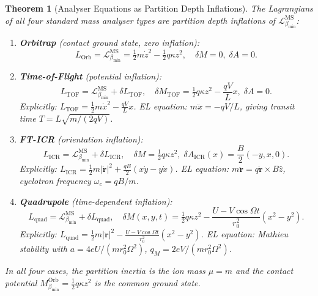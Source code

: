 \documentclass[12pt, a4paper]{article}
\theoremstyle{plain}
\newtheorem{theorem}{Theorem}[section]
\theoremstyle{definition}
\theoremstyle{remark}
\newcommand{\bmin}{\beta_{\min}}
\newcommand{\Lmin}{\mathcal{L}_{\bmin}}
\newcommand{\half}{\tfrac{1}{2}}
\begin{document}
\begin{theorem}[Analyser Equations as Partition Depth Inflations]
\label{thm:inflations}
The Lagrangians of all four standard mass analyser types are partition depth
inflations of $\Lmin^{\mathrm{MS}}$:

\begin{enumerate}[label=(\roman*)]
\item \textbf{Orbitrap} (contact ground state, zero inflation):
\[
  L_{\mathrm{Orb}} = \Lmin^{\mathrm{MS}} = \half m\dot{z}^2 - \half q\kappa z^2,
  \quad \delta M = 0,\;\delta A = 0.
\]

\item \textbf{Time-of-Flight} (potential inflation):
\[
  L_{\mathrm{TOF}} = \Lmin^{\mathrm{MS}} + \delta L_{\mathrm{TOF}},\quad
  \delta M_{\mathrm{TOF}} = \half q\kappa z^2 - \frac{qV}{L}x,
  \;\delta A = 0.
\]
Explicitly: $L_{\mathrm{TOF}} = \half m\dot{x}^2 - \frac{qV}{L}x$.
EL equation: $m\ddot{x} = -qV/L$, giving transit time $T = L\sqrt{m/(2qV)}$.

\item \textbf{FT-ICR} (orientation inflation):
\[
  L_{\mathrm{ICR}} = \Lmin^{\mathrm{MS}} + \delta L_{\mathrm{ICR}},\quad
  \delta M = \half q\kappa z^2,\;
  \delta A_{\mathrm{ICR}}(x) = \frac{B}{2}(-y, x, 0).
\]
Explicitly: $L_{\mathrm{ICR}} = \half m|\dot{\mathbf{r}}|^2 + \frac{qB}{2}
(x\dot{y} - y\dot{x})$.
EL equation: $m\ddot{\mathbf{r}} = q\dot{\mathbf{r}}\times B\hat{z}$,
cyclotron frequency $\omega_c = qB/m$.

\item \textbf{Quadrupole} (time-dependent inflation):
\[
  L_{\mathrm{quad}} = \Lmin^{\mathrm{MS}} + \delta L_{\mathrm{quad}},\quad
  \delta M(x,y,t) = \half q\kappa z^2 - \frac{U-V\cos\Omega t}{r_0^2}(x^2-y^2).
\]
Explicitly: $L_{\mathrm{quad}} = \half m|\dot{\mathbf{r}}|^2 -
\frac{U-V\cos\Omega t}{r_0^2}(x^2-y^2)$.
EL equation: Mathieu stability with $a = 4eU/(mr_0^2\Omega^2)$,
$q_M = 2eV/(mr_0^2\Omega^2)$.
\end{enumerate}

In all four cases, the partition inertia is the ion mass $\mu = m$ and the
contact potential $M_{\bmin}^{\mathrm{Orb}} = \half q\kappa z^2$ is the
common ground state.
\end{theorem}
\end{document}

